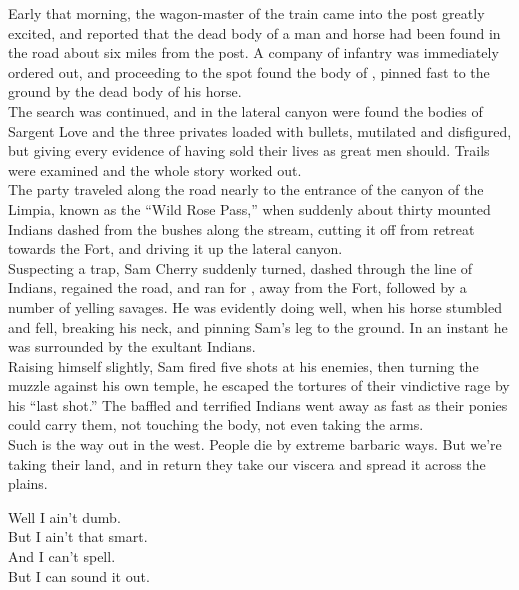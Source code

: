 Early that morning, the wagon-master of the train came into the post greatly excited, and reported that the dead body of a man and horse had been found in the road about six miles from the post. A company of infantry was immediately ordered out, and proceeding to the spot found the body of , pinned fast to the ground by the dead body of his horse. \\

The search was continued, and in the lateral canyon were found the bodies of Sargent Love and the three privates loaded with bullets, mutilated and disfigured, but giving every evidence of having sold their lives as great men should. Trails were examined and the whole story worked out. \\

The party traveled along the road nearly to the entrance of the canyon of the Limpia, known as the ``Wild Rose Pass,'' when suddenly about thirty mounted Indians dashed from the bushes along the stream, cutting it off from retreat towards the Fort, and driving it up the lateral canyon. \\

Suspecting a trap, Sam Cherry suddenly turned, dashed through the line of Indians, regained the road, and ran for , away from the Fort, followed by a number of yelling savages. He was evidently doing well, when his horse stumbled and fell, breaking his neck, and pinning Sam's leg to the ground. In an instant he was surrounded by the exultant Indians. \\

Raising himself slightly, Sam fired five shots at his enemies, then turning the muzzle against his own temple, he escaped the tortures of their vindictive rage by his ``last shot.'' The baffled and terrified Indians went away as fast as their ponies could carry them, not touching the body, not even taking the arms. \\

Such is the way out in the west. People die by extreme barbaric ways. But we're taking their land, and in return they take our viscera and spread it across the  plains. \\




Well I ain't dumb. \\
But I ain't that smart. \\
And I can't spell. \\
But I can sound it out. \\

